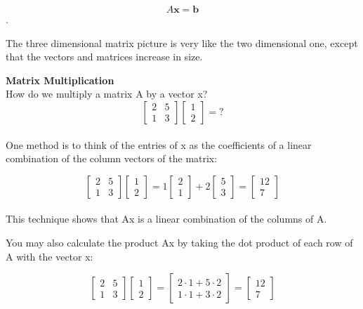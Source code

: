 \documentclass{ximera}
\begin{document}
\[A\textbf{x} = \textbf{b}\].

\noindent
The three dimensional matrix picture is very like the two dimensional one, except that the vectors and matrices increase in size.
\par

\noindent
\textbf{Matrix Multiplication}\\
How do we multiply a matrix A by a vector x?\\

\[\begin{bmatrix} 2 & 5\\ 1 & 3 \end{bmatrix} \begin{bmatrix} 1\\2 \end{bmatrix} = ?\]\\

\noindent
One method is to think of the entries of x as the coefficients of a linear combination of the column vectors of the matrix:

\[\begin{bmatrix} 2 & 5\\ 1 & 3 \end{bmatrix} \begin{bmatrix} 1\\2 \end{bmatrix} = 1\begin{bmatrix} 2\\1 \end{bmatrix} + 2 \begin{bmatrix} 5\\3 \end{bmatrix} = \begin{bmatrix} 12\\7 \end{bmatrix}\]\\

\noindent
This technique shows that Ax is a linear combination of the columns of A. \par 
\noindent
You may also calculate the product Ax by taking the dot product of each row of A with the vector x:

\[\begin{bmatrix} 2 & 5\\ 1 & 3 \end{bmatrix} \begin{bmatrix} 1\\2 \end{bmatrix} = \begin{bmatrix} 2 \cdot 1 + 5 \cdot 2\\ 1 \cdot 1 + 3 \cdot 2 \end{bmatrix} = \begin{bmatrix} 12\\7 \end{bmatrix}\]
\end{document}
